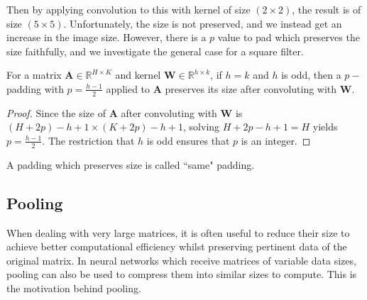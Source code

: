 
\noindent Then by applying convolution to this with kernel of size $(2 \times 2)$, the result is of size $(5 \times 5)$. Unfortunately, the size is not preserved, and we instead get an increase in the image size. However, there is a $p$ value to pad which preserves the size faithfully, and we investigate the general case for a square filter. \\

\begin{proposition}
For a matrix $\textbf{A} \in \mathbb{R}^{H \times K}$ and kernel $\textbf{W} \in \mathbb{R}^{h \times k}$, if $h = k$ and $h$ is odd, then a $p-$padding with $p = \frac{h-1}{2}$ applied to $\textbf{A}$ preserves its size after convoluting with $\textbf{W}$.
\end{proposition}
\begin{proof}
Since the size of $\textbf{A}$ after convoluting with $\textbf{W}$ is $(H+2p)-h+1 \times (K+2p)-h+1$, solving $H+2p-h+1 = H$ yields $p = \frac{h-1}{2}$. The restriction that $h$ is odd ensures that $p$ is an integer.
\end{proof}

\begin{definition}
    A padding which preserves size is called ``same" padding.
\end{definition}

\subsection{Pooling}
When dealing with very large matrices, it is often useful to reduce their size to achieve better computational efficiency whilst preserving pertinent data of the original matrix. In neural networks which receive matrices of variable data sizes, pooling can also be used to compress them into similar sizes to compute. This is the motivation behind pooling.

